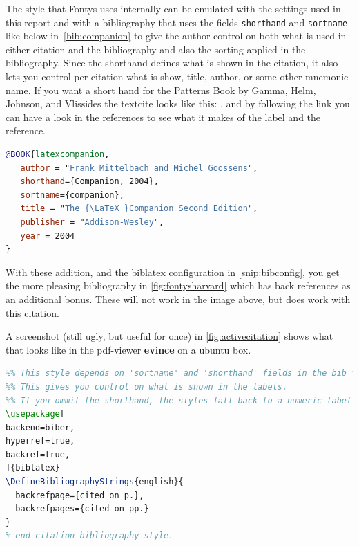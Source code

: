 The style that Fontys uses internally can be emulated with the
settings used in this report and with a bibliography that uses the
fields \texttt{shorthand} and \texttt{sortname} like below
in~\vref{bib:companion} to give the author control on both what is
used in either citation and the bibliography and also the sorting
applied in the bibliography. Since the shorthand defines what is shown in the citation, it also lets you control per citation what is show, title, author, or some other mnemonic name. If you want a short hand for the Patterns Book by Gamma, Helm, Johnson, and Vlissides the textcite looks like this: \textcite{gamma1994design}, and by following the link you can have a look in the references to see what it makes of the label and the reference.

\begin{lstlisting}[language=BibTeX,caption={\label{bib:companion}Using \texttt{shorthand} for label and \texttt{sortname}for sorting}]
  @BOOK{latexcompanion,
   author = "Frank Mittelbach and Michel Goossens",
   shorthand={Companion, 2004},
   sortname={companion},
   title = "The {\LaTeX }Companion Second Edition",
   publisher = "Addison-Wesley",
   year = 2004
}
\end{lstlisting}

With these addition, and the biblatex configuration in \vref{snip:bibconfig}, you get the more pleasing bibliography in \vref{fig:fontysharvard}
which has back references as an additional bonus. These will not work in the image above, but does work with this \textcite{latexcompanion} citation.

A screenshot (still ugly, but useful for once) in \vref{fig:activecitation} shows what that looks like in the pdf-viewer \textbf{evince} on a ubuntu box.

\begin{lstlisting}[language=TeX,caption={\label{snip:bibconfig}Using \texttt{shorthand} for label and \texttt{sortname}for sorting}]
%% citation and bibliography style.
%% This style depends on 'sortname' and 'shorthand' fields in the bib file.
%% This gives you control on what is shown in the labels.
%% If you ommit the shorthand, the styles fall back to a numeric label
\usepackage[
backend=biber,
hyperref=true,
backref=true,
]{biblatex}
\DefineBibliographyStrings{english}{
  backrefpage={cited on p.},
  backrefpages={cited on pp.}
}
% end citation bibliography style.
\end{lstlisting}

